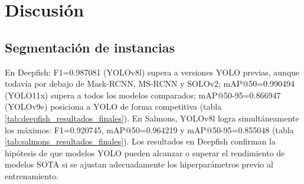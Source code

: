 \section{Discusión}

\subsection{Segmentación de instancias}
En Deepfish: F1=0.987081 (YOLOv8l) supera a versiones YOLO previas, aunque todavía por debajo de Mask-RCNN, MS-RCNN y SOLOv2; mAP@50=0.990494 (YOLO11x) supera a todos los modelos comparados; mAP@50-95=0.866947 (YOLOv9e) posiciona a YOLO de forma competitiva (tabla \ref{tab:deepfish_resultados_finales}). En Salmons, YOLOv8l logra simultáneamente los máximos: F1=0.920745, mAP@50=0.964219 y mAP@50-95=0.855048 (tabla \ref{tab:salmons_resultados_finales}). Los resultados en Deepfish confirman la hipótesis de que modelos YOLO pueden alcanzar o superar el rendimiento de modelos SOTA si se ajustan adecuadamente los hiperparámetros previo al entrenamiento.

